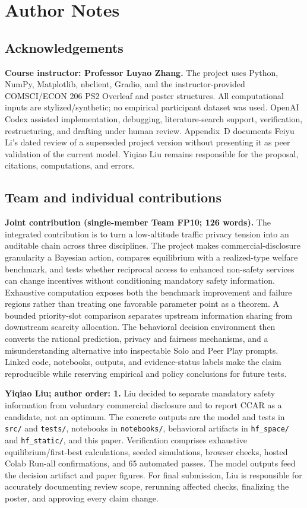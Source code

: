 \clearpage\nobalance\normalsize
\section*{Author Notes}
\subsection*{Acknowledgements}
\textbf{Course instructor: Professor Luyao Zhang.} The project uses Python, NumPy, Matplotlib, nbclient, Gradio, and the instructor-provided COMSCI/ECON 206 PS2 Overleaf and poster structures. All computational inputs are stylized/synthetic; no empirical participant dataset was used. OpenAI Codex assisted implementation, debugging, literature-search support, verification, restructuring, and drafting under human review. Appendix~D documents Feiyu Li's dated review of a superseded project version without presenting it as peer validation of the current model. Yiqiao Liu remains responsible for the proposal, citations, computations, and errors.

\subsection*{Team and individual contributions}
\noindent\textbf{Joint contribution (single-member Team FP10; 126 words).} The integrated contribution is to turn a low-altitude traffic privacy tension into an auditable chain across three disciplines. The project makes commercial-disclosure granularity a Bayesian action, compares equilibrium with a realized-type welfare benchmark, and tests whether reciprocal access to enhanced non-safety services can change incentives without conditioning mandatory safety information. Exhaustive computation exposes both the benchmark improvement and failure regions rather than treating one favorable parameter point as a theorem. A bounded priority-slot comparison separates upstream information sharing from downstream scarcity allocation. The behavioral decision environment then converts the rational prediction, privacy and fairness mechanisms, and a misunderstanding alternative into inspectable Solo and Peer Play prompts. Linked code, notebooks, outputs, and evidence-status labels make the claim reproducible while reserving empirical and policy conclusions for future tests.

\noindent\textbf{Yiqiao Liu; author order: 1.} Liu decided to separate mandatory safety information from voluntary commercial disclosure and to report CCAR as a candidate, not an optimum. The concrete outputs are the model and tests in \texttt{src/} and \texttt{tests/}, notebooks in \texttt{notebooks/}, behavioral artifacts in \texttt{hf\_space/} and \texttt{hf\_static/}, and this paper. Verification comprises exhaustive equilibrium/first-best calculations, seeded simulations, browser checks, hosted Colab Run-all confirmations, and 65 automated passes. The model outputs feed the decision artifact and paper figures. For final submission, Liu is responsible for accurately documenting review scope, rerunning affected checks, finalizing the poster, and approving every claim change.

